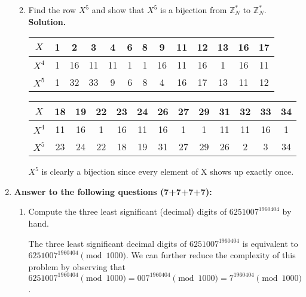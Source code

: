 \documentclass[11pt]{article}
\begin{document}
\begin{enumerate}
\begin{enumerate}
   \vspace{0.2 \textheight}
    \item Find the row $X^5$ and show that $X^5$ is a bijection from $\mathbb{Z}^{*}_N$ to $\mathbb{Z}^{*}_N$.
     \newline
  {\bfseries Solution.}  \newline

   \begin{center}
       \begin{tabular}{|c|c|c|c|c|c|c|c|c|c|c|c|c|}
       \hline
        $X$ & 1 & 2  & 3  & 4  & 6 & 8  & 9  & 11 & 12 & 13 & 16 & 17 \\
       \hline
        $X^4$ & 1 & 16 & 11 & 11 & 1 & 1  & 16 & 11 & 16 & 1  & 16 & 11 \\
        \hline
          $X^5$ & 1 & 32 & 33 & 9  & 6 & 8  & 4  & 16 & 17 & 13 & 11 & 12 \\
       \hline
       \end{tabular}
    \end{center}

      \begin{center}
        \begin{tabular}{|c|c|c|c|c|c|c|c|c|c|c|c|c|}
        \hline
          $X$ & 18 & 19 & 22 & 23 & 24 & 26 & 27 & 29 & 31 & 32 & 33 & 34 \\
        \hline
          $X^4$ & 11 & 16 & 1  & 16 & 11 & 16 & 1  & 1  & 11 & 11 & 16 & 1 \\
        \hline
          $X^5$ & 23 & 24 & 22 & 18 & 19 & 31 & 27 & 29 & 26 & 2  & 3  & 34 \\
        \hline
      \end{tabular}
      \end{center}

      $X^5$ is clearly a bijection since every element of X shows up exactly once.
      
    
     \newpage
\end{enumerate}
   

\item {\bfseries Answer to the following questions (7+7+7+7):}
\begin{enumerate}
    \item Compute the three least significant (decimal) digits of $6251007^{1960404}$ by hand.\newline 
  
      \bfseries{
        The three least significant decimal digits of $6251007^{1960404}$ is equivalent to $6251007^{1960404} \pmod{1000}$. We can further reduce the complexity of this problem by observing that $6251007^{1960404} \pmod{1000} = 007^{1960404} \pmod{1000} = 7^{1960404} \pmod{1000}$. \newline

}
\end{enumerate}
\end{enumerate}
\end{document}
